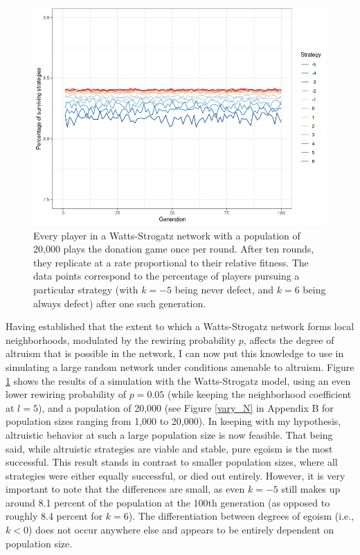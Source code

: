 \documentclass{JASSS}
\begin{document}
\begin{figure}
	\centering
	\includegraphics[width=\linewidth]{./figures/results_N20000_truthful_new.png}
	\caption{Every player in a Watts-Strogatz network with a population of 20,000 plays the donation game once per round. After ten rounds, they replicate at a rate proportional to their relative fitness. The data points correspond to the percentage of players pursuing a particular strategy (with $k=-5$ being never defect, and $k=6$ being always defect) after one such generation.}
	\label{WS_20000_default}
\end{figure}

Having established that the extent to which a Watts-Strogatz network forms local neighborhoods, modulated by the rewiring probability $p$, affects the degree of altruism that is possible in the network, I can now put this knowledge to use in simulating a large random network under conditions amenable to altruism. Figure \ref{WS_20000_default} shows the results of a simulation with the Watts-Strogatz model, using an even lower rewiring probability of $p=0.05$ (while keeping the neighborhood coefficient at $l=5$), and a population of 20,000 (see Figure \ref{vary_N} in Appendix B for population sizes ranging from 1,000 to 20,000). In keeping with my hypothesis, altruistic behavior at such a large population size is now feasible. That being said, while altruistic strategies are viable and stable, pure egoism is the most successful. This result stands in contrast to smaller population sizes, where all strategies were either equally successful, or died out entirely. However, it is very important to note that the differences are small, as even $k=-5$ still makes up around 8.1 percent of the population at the 100th generation (as opposed to roughly 8.4 percent for $k=6$). The differentiation between degrees of egoism (i.e., $k<0$) does not occur anywhere else and appears to be entirely dependent on population size.
\end{document}
